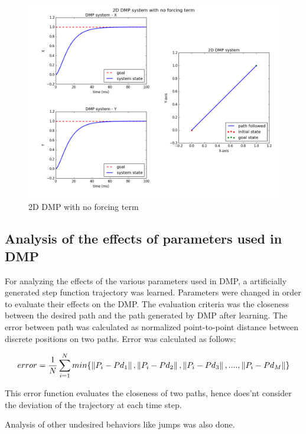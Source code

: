 \begin{figure}[H]
	\includegraphics[width=\textwidth]{images/dmp_no_f.png}
	\caption{2D DMP with no forcing term}
	\label{fig:DMP_2DOF}
\end{figure}


\newpage

\subsection{Analysis of the effects of parameters used in DMP}

For analyzing the effects of the various parameters used in DMP, a artificially generated step function trajectory was learned. Parameters were changed in order to evaluate their effects on the DMP. The evaluation criteria was the closeness between the desired path and the path generated by DMP after learning. The error between path was calculated as normalized point-to-point distance between discrete positions on two paths. Error was calculated as follows:

\begin{equation}
	error = \frac{1}{N}\sum_{i = 1}^{N}min\{\left\lVert P_{i} - Pd_{1}\right\rVert, \left\lVert P_{i} - Pd_{2}\right\rVert, \left\lVert P_{i} - Pd_{3}\right\rVert, .... , \left\lVert P_{i} - Pd_{M}\right\rVert\}
\end{equation}

This error function evaluates the closeness of two paths, hence does'nt consider the deviation of the trajectory at each time step. 

 Analysis of other undesired behaviors like jumps was also done.  

